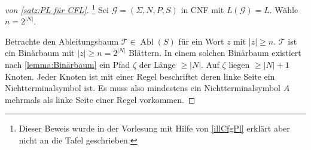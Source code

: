 \begin{proof}[von \autoref{satz:PL für CFL}]\footnote{
		Dieser Beweis wurde in der Vorlesung mit Hilfe von \autoref{illCfgPl} erklärt aber nicht an die Tafel geschrieben.
	}
	Sei $\mathcal{G}= (\Sigma,N,P,S)$ in \ac{CNF} mit
    $L(\mathcal{G}) = L$. Wähle $n=2^{|N|}$.
    
     Betrachte den Ableitungsbaum $\mathcal{T} \in \operatorname{Abl}(S)$ für ein Wort $z$ mit $|z|\geq n$. 
  $\mathcal{T}$ ist ein Binärbaum mit $|z|\geq n = 2^{|N|}$ Blättern.
  In einem solchen Binärbaum existiert nach \autoref{lemma:Binärbaum} ein Pfad $\zeta$ der Länge $\geq |N|$.
	Auf $\zeta$ liegen $\geq |N|+1$ Knoten.
	Jeder Knoten ist mit einer Regel beschriftet deren linke Seite ein Nichtterminalsymbol ist.
	Es muss also mindestens ein Nichtterminalsymbol $A$ mehrmals als linke Seite einer Regel vorkommen.
	

\end{proof}
